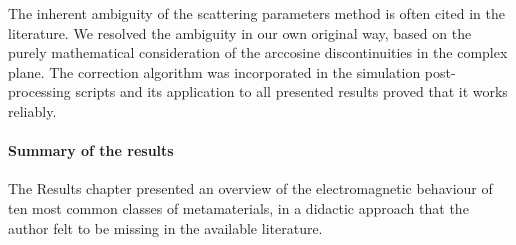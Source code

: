 The inherent ambiguity of the scattering parameters method is often cited in the literature. We resolved the ambiguity in our own original way, based on the purely mathematical consideration of the arccosine discontinuities in the complex plane. The correction algorithm was incorporated in the simulation post-processing scripts and its application to all presented results proved that it works reliably. 

\paragraph{Summary of the results}
The Results chapter presented an overview of the electromagnetic behaviour of ten most common classes of metamaterials, in a didactic approach that the author felt to be missing in the available literature. %

